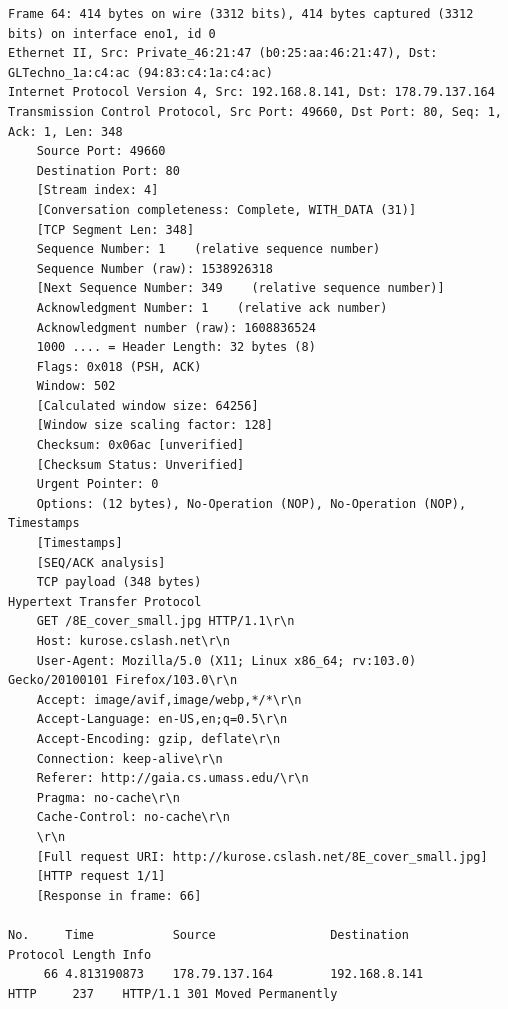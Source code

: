 \documentclass[a4paper,11pt,final]{report}
\begin{document}
\begin{lstlisting}[breaklines]
Frame 64: 414 bytes on wire (3312 bits), 414 bytes captured (3312 bits) on interface eno1, id 0
Ethernet II, Src: Private_46:21:47 (b0:25:aa:46:21:47), Dst: GLTechno_1a:c4:ac (94:83:c4:1a:c4:ac)
Internet Protocol Version 4, Src: 192.168.8.141, Dst: 178.79.137.164
Transmission Control Protocol, Src Port: 49660, Dst Port: 80, Seq: 1, Ack: 1, Len: 348
    Source Port: 49660
    Destination Port: 80
    [Stream index: 4]
    [Conversation completeness: Complete, WITH_DATA (31)]
    [TCP Segment Len: 348]
    Sequence Number: 1    (relative sequence number)
    Sequence Number (raw): 1538926318
    [Next Sequence Number: 349    (relative sequence number)]
    Acknowledgment Number: 1    (relative ack number)
    Acknowledgment number (raw): 1608836524
    1000 .... = Header Length: 32 bytes (8)
    Flags: 0x018 (PSH, ACK)
    Window: 502
    [Calculated window size: 64256]
    [Window size scaling factor: 128]
    Checksum: 0x06ac [unverified]
    [Checksum Status: Unverified]
    Urgent Pointer: 0
    Options: (12 bytes), No-Operation (NOP), No-Operation (NOP), Timestamps
    [Timestamps]
    [SEQ/ACK analysis]
    TCP payload (348 bytes)
Hypertext Transfer Protocol
    GET /8E_cover_small.jpg HTTP/1.1\r\n
    Host: kurose.cslash.net\r\n
    User-Agent: Mozilla/5.0 (X11; Linux x86_64; rv:103.0) Gecko/20100101 Firefox/103.0\r\n
    Accept: image/avif,image/webp,*/*\r\n
    Accept-Language: en-US,en;q=0.5\r\n
    Accept-Encoding: gzip, deflate\r\n
    Connection: keep-alive\r\n
    Referer: http://gaia.cs.umass.edu/\r\n
    Pragma: no-cache\r\n
    Cache-Control: no-cache\r\n
    \r\n
    [Full request URI: http://kurose.cslash.net/8E_cover_small.jpg]
    [HTTP request 1/1]
    [Response in frame: 66]

No.     Time           Source                Destination           Protocol Length Info
     66 4.813190873    178.79.137.164        192.168.8.141         HTTP     237    HTTP/1.1 301 Moved Permanently 


\end{lstlisting}
\end{document}

